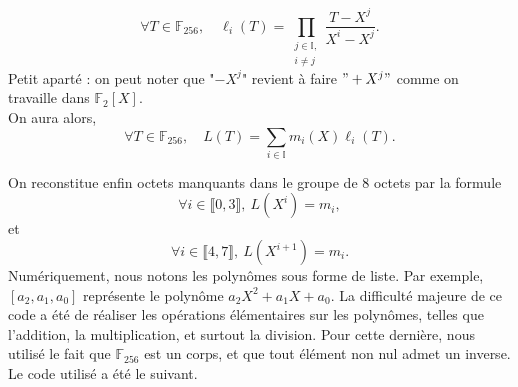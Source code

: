 \documentclass{article}
\begin{document}
$$
\forall T \in \mathbb{F}_{256}, \quad \ell_i(T) = \prod_{\substack{j \in \mathbb{I}, \\ i \neq j}} \frac{T - X^j}{X^i - X^j}.
$$
Petit aparté : on peut noter que "$-X^j$" revient à faire $"+X^j"$ comme on travaille dans $\mathbb{F}_2[X]$.\\
On aura alors,
$$
\forall T \in \mathbb{F}_{256}, \quad L(T) = \sum_{i \in \mathbb{I}} m_i(X) \ell_i(T).
$$

On reconstitue enfin octets manquants dans le groupe de $8$ octets par la formule
$$\forall i \in \llbracket 0, 3 \rrbracket, \ L(X^i) = m_i,$$
et $$\forall i \in \llbracket 4, 7 \rrbracket, \ L(X^{i+1}) = m_i.$$
Numériquement, nous notons les polynômes sous forme de liste. Par exemple, $[a_2, a_1, a_0]$ représente le polynôme $a_2 X^2 + a_1 X + a_0$. La difficulté majeure de ce code a été de réaliser les opérations élémentaires sur les polynômes, telles que l'addition, la multiplication, et surtout la division. Pour cette dernière, nous utilisé le fait que $\mathbb{F}_{256}$ est un corps, et que tout élément non nul admet un inverse. Le code utilisé a été le suivant.
\end{document}
